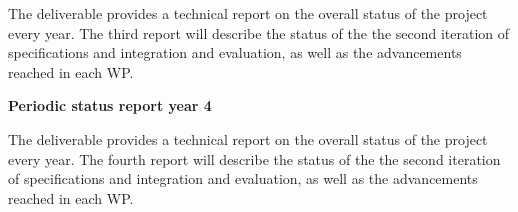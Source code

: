 {\begin{deliverables}{\WPManagementNo}
The deliverable provides a technical report on the overall status of the project every year. The third report will describe the status of the the second iteration of specifications and integration and evaluation, as well as the advancements reached in each WP.

\item {\bf  Periodic status report year 4} 
	\delresponsible{\VW}

The deliverable provides a technical report on the overall status of the project every year. The fourth report will describe the status of the the second iteration of specifications and integration and evaluation, as well as the advancements reached in each WP.

\end{deliverables}


}






